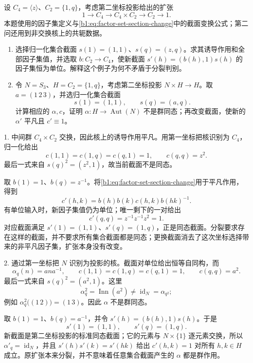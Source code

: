 \begin{exercise}\label{b1:ex:06-change-split-section}
	设 \(C_4=\langle z\rangle\)、\(C_2=\{1,q\}\)，考虑第二坐标投影给出的扩张
	\[
		1\longrightarrow C_4\longrightarrow C_4\times C_2\longrightarrow C_2\longrightarrow1.
	\]
	本题使用的因子集定义与\eqref{b1:eq:factor-set-section-change}中的截面变换公式；第二问还用到非交换核上的共轭数据。
	\begin{enumerate}
		\item 选择归一化集合截面 \(s(1)=(1,1)\)、\(s(q)=(z,q)\)。求其诱导作用和全部因子集值，并选取 \(b:C_2\rightarrow C_4\)，使新截面 \(s'(h)=(b(h),1)s(h)\) 的因子集恒为单位。解释这个例子为何不矛盾于分裂判别。
		\item 令 \(N=S_3\)、\(H=C_2=\{1,q\}\)，考虑第二坐标投影 \(N\times H\rightarrow H\)。取 \(a=(1\,2\,3)\)，并选归一化集合截面
			\[
				s(1)=(1,1),\qquad s(q)=(a,q).
			\]
			计算相应的 \(\alpha,c\)，证明 \(\alpha:H\rightarrow\operatorname{Aut}(N)\) 不是群同态；再改变截面，使新的 \(\alpha'\) 平凡且 \(c'\equiv1\)。
	\end{enumerate}
\end{exercise}
\begin{solution}
	1. 中间群 \(C_4\times C_2\) 交换，因此核上的诱导作用平凡。用第一坐标把核识别为 \(C_4\)，归一化给出
	\[
		c(1,1)=c(1,q)=c(q,1)=1,\qquad c(q,q)=z^2.
	\]
	最后一式来自 \(s(q)^2=(z^2,1)\)，故当前截面不是同态。

	取 \(b(1)=1\)、\(b(q)=z^{-1}\)。将\eqref{b1:eq:factor-set-section-change}用于平凡作用，得到
	\[
		c'(h,k)=b(h)b(k)c(h,k)b(hk)^{-1}.
	\]
	有单位输入时，新因子集值仍为单位；唯一剩下的一对给出
	\[
		c'(q,q)=z^{-1}z^{-1}z^2=1.
	\]
	对应截面满足 \(s'(1)=(1,1)\)、\(s'(q)=(1,q)\)，正是同态截面。分裂要求存在这样的截面，并不要求所有集合截面都是同态；更换截面消去了这次坐标选择带来的非平凡因子集，扩张本身没有改变。

	2. 通过第一坐标把 \(N\) 识别为投影的核。截面对单位给出恒等自同构，而
	\[
		\alpha_q(n)=ana^{-1}, \qquad c(1,1)=c(1,q)=c(q,1)=1, \qquad c(q,q)=a^2.
	\]
	最后一式来自 \(s(q)^2=(a^2,1)\)。这里
	\[
		\alpha_q^2=\operatorname{Inn}(a^2)\neq\operatorname{id}_N =\alpha_{q^2};
	\]
	例如 \(\alpha_q^2\bigl((1\,2)\bigr)=(1\,3)\)。因此 \(\alpha\) 不是群同态。

	取 \(b(1)=1\)、\(b(q)=a^{-1}\)，并令 \(s'(h)=(b(h),1)s(h)\)。于是
	\[
		s'(1)=(1,1),\qquad s'(q)=(1,q).
	\]
	新截面是第二坐标投影的标准同态截面；它的元素与 \(N\times\{1\}\) 逐元素交换，所以 \(\alpha'_q=\operatorname{id}_N\)，并且 \(s'(h)s'(k)=s'(hk)\) 给出 \(c'(h,k)=1\) 对所有 \(h,k\in H\) 成立。原扩张本来分裂，并不意味着任意集合截面产生的 \(\alpha\) 都是群作用。
\end{solution}
